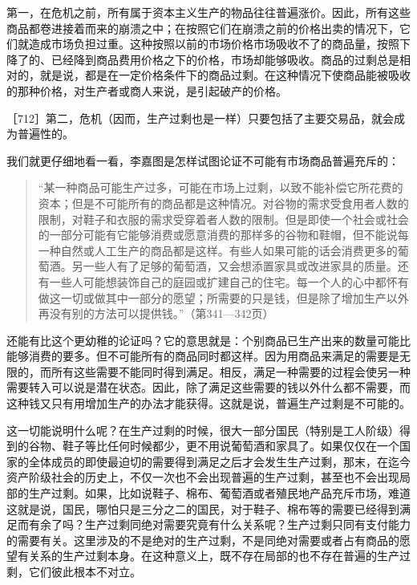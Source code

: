 第一，在危机之前，所有属于资本主义生产的物品往往普遍涨价。因此，所有这些商品都卷进接着而来的崩溃之中；在按照它们在崩溃之前的价格出卖的情况下，它们就造成市场负担过重。这种按照以前的市场价格市场吸收不了的商品量，按照下降了的、已经降到商品费用价格之下的价格，市场却能够吸收。商品的过剩总是相对的，就是说，都是在一定价格条件下的商品过剩。在这种情况下使商品能被吸收的那种价格，对生产者或商人来说，是引起破产的价格。

［712］第二，危机（因而，生产过剩也是一样）只要包括了主要交易品，就会成为普遍性的。


我们就更仔细地看一看，李嘉图是怎样试图论证不可能有市场商品普遍充斥的：

\begin{quote}{“某一种商品可能生产过多，可能在市场上过剩，以致不能补偿它所花费的资本；但是不可能所有的商品都是这种情况。对谷物的需求受食用者人数的限制，对鞋子和衣服的需求受穿着者人数的限制。但是即使一个社会或社会的一部分可能有它能够消费或愿意消费的那样多的谷物和鞋帽，但不能说每一种自然或人工生产的商品都是这样。有些人如果可能的话会消费更多的葡萄酒。另一些人有了足够的葡萄酒，又会想添置家具或改进家具的质量。还有一些人可能想装饰自己的庭园或扩建自己的住宅。每一个人的心中都怀有做这一切或做其中一部分的愿望；所需要的只是钱，但是除了增加生产以外再没有别的方法可以提供钱。”（第341—342页）}\end{quote}

还能有比这个更幼稚的论证吗？它的意思就是：个别商品已生产出来的数量可能比能够消费的要多。但不可能所有的商品同时都这样。因为用商品来满足的需要是无限的，而所有这些需要不能同时得到满足。相反，满足一种需要的过程会使另一种需要转入可以说是潜在状态。因此，除了满足这些需要的钱以外什么都不需要，而这种钱又只有用增加生产的办法才能获得。这就是说，普遍生产过剩是不可能的。

这一切能说明什么呢？在生产过剩的时候，很大一部分国民（特别是工人阶级）得到的谷物、鞋子等比任何时候都少，更不用说葡萄酒和家具了。如果仅仅在一个国家的全体成员的即使最迫切的需要得到满足之后才会发生生产过剩，那末，在迄今资产阶级社会的历史上，不仅一次也不会出现普遍的生产过剩，甚至也不会出现局部的生产过剩。如果，比如说鞋子、棉布、葡萄酒或者殖民地产品充斥市场，难道这就是说，国民，哪怕只是三分之二的国民，对于鞋子、棉布等的需要已经得到满足而有余了吗？生产过剩同绝对需要究竟有什么关系呢？生产过剩只同有支付能力的需要有关。这里涉及的不是绝对的生产过剩，不是同绝对需要或者占有商品的愿望有关系的生产过剩本身。在这种意义上，既不存在局部的也不存在普遍的生产过剩，它们彼此根本不对立。

